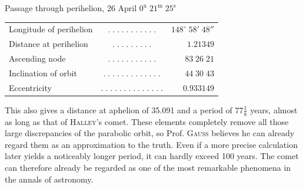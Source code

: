 \begin{center}\fontsize{10}{12}\selectfont Passage through perihelion, 26 April $0^{\mathrm u}\;21^{\mathrm m}\;25^{\mathrm s}$\end{center}
\begin{center}\fontsize{10}{12}\selectfont\setlength{\tabcolsep}{3pt}\renewcommand{\arraystretch}{1.15}\begin{tabular}{lcr}
Longitude of perihelion & $.\;.\;.\;.\;.\;.\;.\;.\;.\;.\;.$ & $148^\circ\;58'\;48''$\\
Distance at perihelion & $.\;.\;.\;.\;.\;.\;.\;.\;.$ & $1.21349$\\
Ascending node & $.\;.\;.\;.\;.\;.\;.\;.\;.\;.\;.$ & $83\;26\;21$\\
Inclination of orbit & $.\;.\;.\;.\;.\;.\;.\;.\;.\;.\;.\;.\;.$ & $44\;30\;43$\\
Eccentricity & $.\;.\;.\;.\;.\;.\;.\;.\;.\;.\;.\;.\;.\;.$ & $0.933149$\\
\end{tabular}\end{center}

\par\indent This also gives a distance at aphelion of 35.091 and a period of $77\frac{1}{8}$ years, almost as long as that of \textsc{Halley}’s comet. These elements completely remove all those large discrepancies of the parabolic orbit, so Prof. \textsc{Gauss} believes he can already regard them as an approximation to the truth. Even if a more precise calculation later yields a noticeably longer period, it can hardly exceed 100 years. The comet can therefore already be regarded as one of the most remarkable phenomena in the annals of astronomy.
